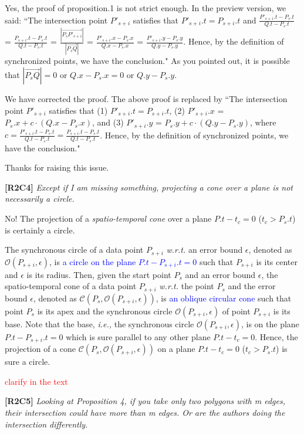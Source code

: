 \documentclass{letter}
\newcommand{\ie}{\emph{i.e.,}\xspace}
\newcommand{\wrt}{\emph{w.r.t.}\xspace}
\newcommand{\cone}[1]{{$\mathcal{C}{#1}$}}
\renewcommand{\circle}[1]{{$\mathcal{O}{#1}$}}
\begin{document}
Yes, the proof of proposition.1 is not strict enough. In the preview version, we said:
``The intersection point $P'_{s+i}$ satisfies that $P'_{s+i}.t = P_{s+i}.t$ and
$\frac{P'_{s+i}.t - P_{s}.t}{Q.t - P_{s}.t}$ = $\frac{P_{s+i}.t - P_{s}.t}{Q.t - P_{s}.t}$  =
$\frac{|\overrightarrow{P_sP'_{s+i}}|}{|\overrightarrow{P_sQ}|}$ =
$\frac{P'_{s+i}.x - P_{s}.x}{Q.x - P_{s}.x}$ = 
$\frac{P'_{s+i}.y - P_{s}.y}{Q.y - P_{s}.y}$.
Hence, by the definition of synchronized points, we have the conclusion."
As you pointed out, it is possible that $|\overrightarrow{P_sQ}|=0$ or $Q.x - P_{s}.x=0$ or $Q.y - P_{s}.y$.

We have corrected the proof. The above proof is replaced by
``The intersection point $P'_{s+i}$ satisfies that 
(1) $P'_{s+i}.t = P_{s+i}.t$, 
(2) $P'_{s+i}.x$ = $P_s.x +  c\cdot(Q.x - P_s.x)$, and
(3) $P'_{s+i}.y$ = $P_s.y +  c\cdot(Q.y - P_s.y)$, 
where $c= \frac{P'_{s+i}.t - P_{s}.t}{Q.t - P_{s}.t}= \frac{P_{s+i}.t-P_s.t}{Q.t-P_s.t}$.
Hence, by the definition of synchronized points, we have the conclusion."

Thanks for raising this issue.


\textbf{[R2C4]} \emph{Except if I am missing something, projecting a cone over a plane is not necessarily a circle.}

No! The projection of a \emph{spatio-temporal cone} over a plane $P.t- t_c = 0$ ($t_c > P_s.t$) is certainly a circle. 

The synchronous circle of a data point $P_{s+i}$ \wrt an error bound $\epsilon$, denoted as \circle{(P_{s+i}, \epsilon)}, is \textcolor{blue}{a circle on the plane $P.t-P_{s+i}.t = 0$} such that $P_{s+i}$ is its center and $\epsilon$ is its radius.
%
Then, given the start point $P_s$ and an error bound $\epsilon$, the spatio-temporal cone of a data point $P_{s+i}$ \wrt the point $P_s$ and the error bound $\epsilon$, denoted as \cone{(P_s, \mathcal{O}(P_{s+i}, \epsilon))}, is \textcolor{blue}{an oblique circular cone} such that point $P_s$ is its apex and the synchronous circle $\mathcal{O}(P_{s+i}, \epsilon)$ of point $P_{s+i}$ is its base. Note that the base, \ie the synchronous circle $\mathcal{O}(P_{s+i}, \epsilon)$, is on the plane $P.t-P_{s+i}.t = 0$ which is sure parallel to any other plane $P.t- t_c = 0$. Hence, the  projection of a cone \cone{(P_s, \mathcal{O}(P_{s+i}, \epsilon))} on a plane $P.t- t_c = 0$ ($t_c > P_s.t$) is sure a circle.

\textcolor{red}{clarify in the text}

\textbf{[R2C5]} \emph{Looking at Proposition 4, if you take only two polygons with m edges, their intersection could have more than m edges. Or are the authors doing the intersection differently.}
\end{document}
